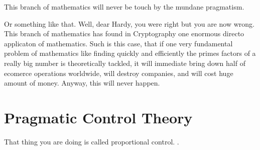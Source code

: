 \documentclass[11pt,fleqn]{book} %
\begin{document}
This branch of mathematics will never be touch by the mundane pragmatism.

Or something like that.  Well, dear Hardy, you were right but you are now wrong.  This branch of mathematics has found in Cryptography one enormous directo applicaton of mathematics.  Such is this case, that if one very fundamental problem of mathematics like finding quickly and efficiently the primes factors of a really big number is theoretically tackled, it will immediate bring down half of ecomerce operations worldwide, will destroy companies, and will cost huge amount of money.  Anyway, this will never happen. 

\chapter{Pragmatic Control Theory}

That thing you are doing is called proportional control. \cite{book_key}.



\printbibliography
\end{document}
